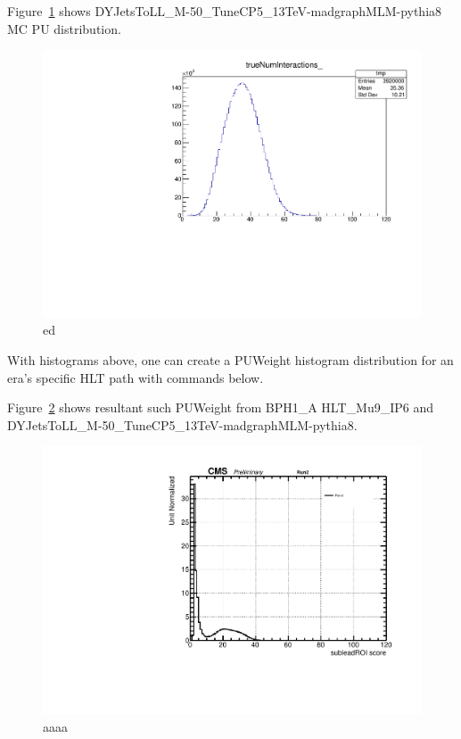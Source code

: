 Figure~\ref{fig:MCPU} shows DYJetsToLL\_M-50\_TuneCP5\_13TeV-madgraphMLM-pythia8 MC PU distribution.
\begin{figure}[h!]
  \caption{ed}
  \label{fig:MCPU}
  \centering
  \includegraphics[width=0.67\linewidth]{figs/mcPU.pdf}

\end{figure}



With histograms above, one can create a PUWeight histogram distribution for an era's specific HLT path with commands below.

Figure~\ref{fig:PUWeight9} shows resultant such PUWeight from BPH1\_A HLT\_Mu9\_IP6 and DYJetsToLL\_M-50\_TuneCP5\_13TeV-madgraphMLM-pythia8.
\begin{figure}[h!]
  \caption{aaaa}
  \label{fig:PUWeight9}
  \centering
  \includegraphics[width=0.67\linewidth]{figs/PUWeight_PUWeight.pdf}

\end{figure}
